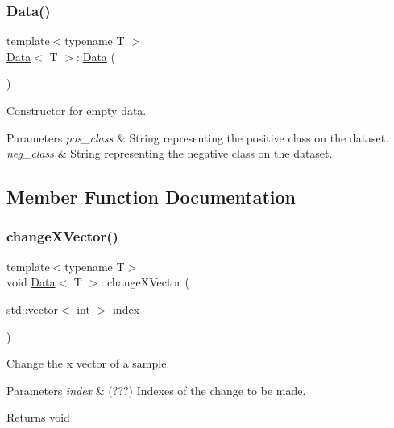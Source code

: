 \subsubsection{\texorpdfstring{Data()}{Data()}\hspace{0.1cm}{\footnotesize\ttfamily [2/2]}}
{\footnotesize\ttfamily template$<$typename T $>$ \\
\hyperlink{class_data}{Data}$<$ T $>$\+::\hyperlink{class_data}{Data} (\begin{DoxyParamCaption}{ }\end{DoxyParamCaption})}



Constructor for empty data. 


\begin{DoxyParams}{Parameters}
{\em pos\+\_\+class} & String representing the positive class on the dataset. \\
\hline
{\em neg\+\_\+class} & String representing the negative class on the dataset. \\
\hline
\end{DoxyParams}


\subsection{Member Function Documentation}
\mbox{\label{class_data_a9cf86608e6a02b80c9755646d7cb55fb}} 
\subsubsection{\texorpdfstring{change\+X\+Vector()}{changeXVector()}}
{\footnotesize\ttfamily template$<$typename T$>$ \\
void \hyperlink{class_data}{Data}$<$ T $>$\+::change\+X\+Vector (\begin{DoxyParamCaption}\item[{std\+::vector$<$ int $>$}]{index }\end{DoxyParamCaption})}



Change the x vector of a sample. 


\begin{DoxyParams}{Parameters}
{\em index} & (???) Indexes of the change to be made. \\
\hline
\end{DoxyParams}
\begin{DoxyReturn}{Returns}
void 
\end{DoxyReturn}
\mbox{\label{class_data_ae1cc8dec46ae498a0d00f4e573edc795}} 

